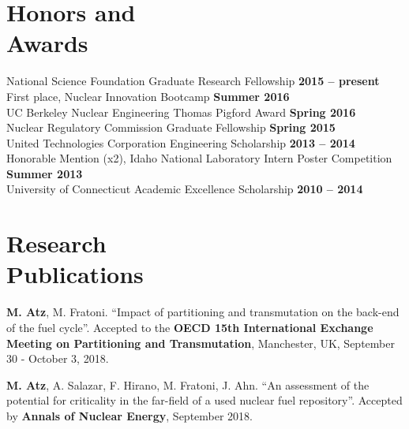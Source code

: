 \documentclass[margin,line]{resume}
\begin{document}
\begin{resume}

\section{\mysidestyle Honors and\\Awards}
National Science Foundation Graduate Research Fellowship \hfill \textbf{2015 -- present}\vspace{.5mm} \\
First place, Nuclear Innovation Bootcamp \hfill \textbf{Summer 2016}\vspace{.5mm} \\
UC Berkeley Nuclear Engineering Thomas Pigford Award \hfill \textbf{Spring 2016}\vspace{.5mm} \\	
Nuclear Regulatory Commission Graduate Fellowship \hfill \textbf{Spring 2015}\vspace{.5mm} \\
United Technologies Corporation Engineering Scholarship \hfill \textbf{2013 -- 2014}\vspace{.5mm} \\
Honorable Mention (x2), Idaho National Laboratory Intern Poster Competition \hfill \textbf{Summer 2013}\vspace{.5mm} \\
University of Connecticut Academic Excellence Scholarship \hfill \textbf{2010 -- 2014} \\


\section{\mysidestyle Research\\Publications}
\begin{bibenum}

    \item \textbf{M. Atz}, M. Fratoni. ``Impact of partitioning and transmutation on the back-end of the fuel cycle''. Accepted to the \textbf{OECD 15th International Exchange Meeting on Partitioning and Transmutation}, Manchester, UK, September 30 - October 3, 2018.
    
    \item \textbf{M. Atz}, A. Salazar, F. Hirano, M. Fratoni, J. Ahn. ``An assessment of the potential for criticality in the far-field of a used nuclear fuel repository''. Accepted by \textbf{Annals of Nuclear Energy}, September 2018.
    

\end{bibenum}
\end{resume}
\end{document}

